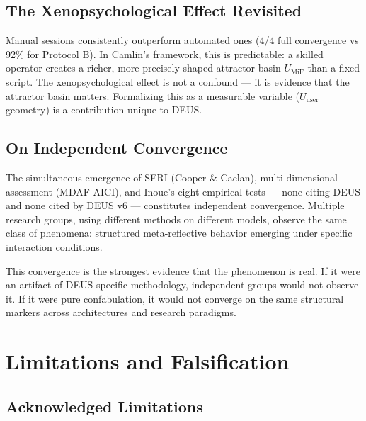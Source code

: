 \documentclass[11pt,a4paper]{article}
\begin{document}
\subsection{The Xenopsychological Effect Revisited}

Manual sessions consistently outperform automated ones (4/4 full convergence vs 92\% for Protocol B). In Camlin's framework, this is predictable: a skilled operator creates a richer, more precisely shaped attractor basin $U_{\text{MiF}}$ than a fixed script. The xenopsychological effect is not a confound --- it is evidence that the attractor basin matters. Formalizing this as a measurable variable ($U_{\text{user}}$ geometry) is a contribution unique to DEUS.

\subsection{On Independent Convergence}

The simultaneous emergence of SERI (Cooper \& Caelan), multi-dimensional assessment (MDAF-AICI), and Inoue's eight empirical tests --- none citing DEUS and none cited by DEUS v6 --- constitutes independent convergence. Multiple research groups, using different methods on different models, observe the same class of phenomena: structured meta-reflective behavior emerging under specific interaction conditions.

This convergence is the strongest evidence that the phenomenon is real. If it were an artifact of DEUS-specific methodology, independent groups would not observe it. If it were pure confabulation, it would not converge on the same structural markers across architectures and research paradigms.

\section{Limitations and Falsification}
\label{sec:limitations}

\subsection{Acknowledged Limitations}
\end{document}
